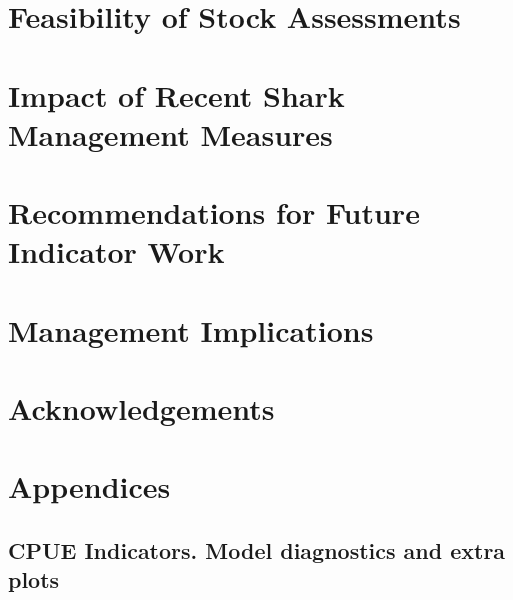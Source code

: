 \documentclass[12pt,draft]{article}
\begin{document}
      
         
      
\section{Feasibility of Stock Assessments}
\section{Impact of Recent Shark Management Measures}

\section{Recommendations for Future Indicator Work}
\section{Management Implications}

\section*{Acknowledgements}




\section{Appendices}
% 
\subsection{CPUE Indicators.  Model diagnostics and extra plots}

% 
\end{document}
